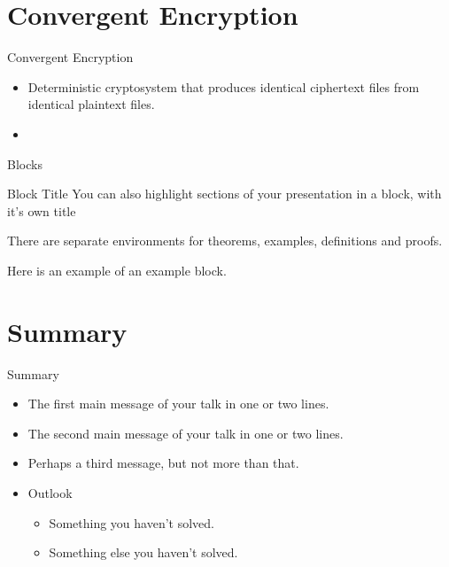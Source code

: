 \documentclass{beamer}
\begin{document}
\section{Convergent Encryption}
\begin{frame}{Convergent Encryption}
	\begin{itemize}
		\item Deterministic cryptosystem that produces  identical ciphertext files from identical plaintext files.
		\item 
	\end{itemize}
\end{frame}

\begin{frame}{Blocks}
\begin{block}{Block Title}
You can also highlight sections of your presentation in a block, with it's own title
\end{block}
\begin{theorem}
There are separate environments for theorems, examples, definitions and proofs.
\end{theorem}
\begin{example}
Here is an example of an example block.
\end{example}
\end{frame}

\section*{Summary}

\begin{frame}{Summary}
  \begin{itemize}
  \item
    The \alert{first main message} of your talk in one or two lines.
  \item
    The \alert{second main message} of your talk in one or two lines.
  \item
    Perhaps a \alert{third message}, but not more than that.
  \end{itemize}
  
  \begin{itemize}
  \item
    Outlook
    \begin{itemize}
    \item
      Something you haven't solved.
    \item
      Something else you haven't solved.
    \end{itemize}
  \end{itemize}
\end{frame}
\end{document}

